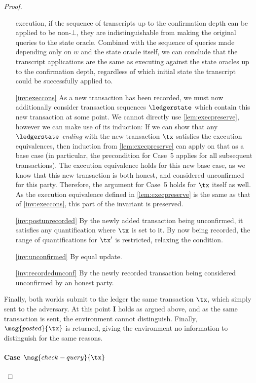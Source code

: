 \begin{proof}
\begin{enumerate}
    execution, if the sequence of transcripts up to the confirmation
      depth can be applied to be non-$\bot$, they are indistinguishable from
      making the original queries to the state oracle. Combined with the sequence
    of queries made depending only on $w$ and the state oracle itself, we can
    conclude that the transcript applications are the same as executing against
    the state oracles up to the confirmation depth, regardless of which initial state the transcript could be
    successfully applied to.
  \item[\ref{inv:execcons}] As a new transaction has been recorded, we must
    now additionally consider transaction sequences $\ledgerstate$ which contain
    this new transaction at some point. We cannot directly use
    \autoref{lem:execpreserve}, however we can make use of its induction: If
    we can show that any $\ledgerstate$ \emph{ending} with the new transaction
    $\tx$ satisfies the execution equivalences, then induction from
    \autoref{lem:execpreserve} can apply on that as a base case (in
    particular, the precondition for Case~5 applies for all subsequent
    transactions). The execution equivalence holds for this new base case, as we
    know that this new transaction is both honest, and considered unconfirmed
    for this party. Therefore, the argument for Case~5 holds for $\tx$ itself as
    well. As the execution equivalence defined in \autoref{lem:execpreserve}
    is the same as that of \ref{inv:execcons}, this part of the invariant is
    preserved.
  \item[\ref{inv:postunrecorded}] By the newly added transaction being
    unconfirmed, it satisfies any quantification where $\tx$ is set to it. By
    now being recorded, the range of quantifications for $\tx'$ is restricted,
    relaxing the condition.
  \item[\ref{inv:unconfirmed}] By equal update.
  \item[\ref{inv:recordedunconf}] By the newly recorded transaction being
    considered unconfirmed by an honest party.
\end{enumerate}

Finally, both worlds submit to the ledger the same transaction $\tx$, which
simply sent to the adversary. At this point $\boldsymbol I$ holds as argued
above, and as the same transaction is sent, the environment cannot distinguish.
Finally, $\msg{posted}{\tx}$ is returned, giving the environment no information
to distinguish for the same reasons.

\paragraph{Case {\normalfont$\msg{check-query}{\tx}$}}


\end{proof}
